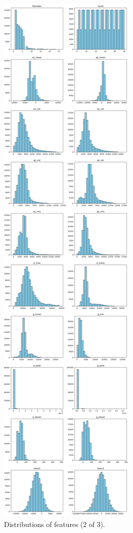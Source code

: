 \documentclass[10pt,twocolumn]{article}
\begin{document}
\begin{figure}[H]
    \centering
    \includegraphics[width=0.85\linewidth, height=0.9\textheight]{distribution_2.png}
    \caption{Distributions of features (2 of 3).}
    \label{fig:distribution-2}
\end{figure}
\end{document}
